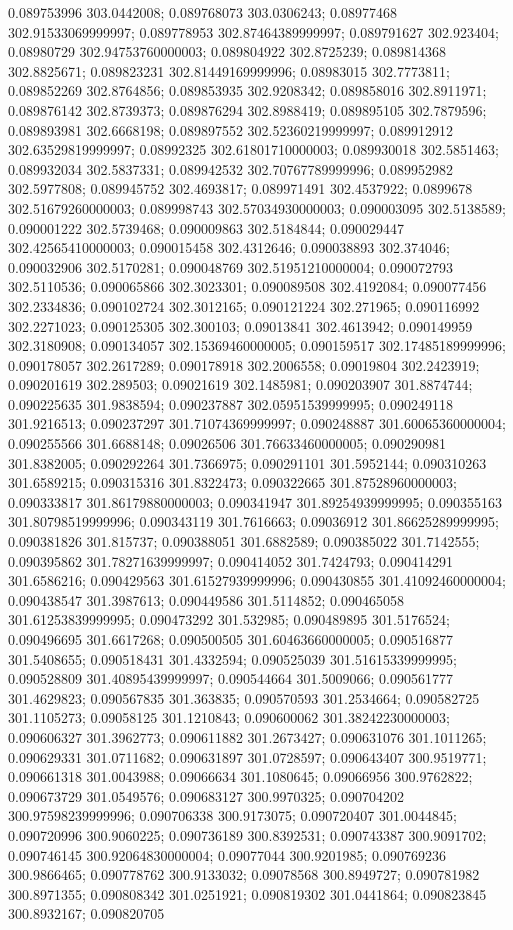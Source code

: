 0.089753996 303.0442008; 0.089768073 303.0306243; 0.08977468 302.91533069999997; 0.089778953 302.87464389999997; 0.089791627 302.923404; 0.08980729 302.94753760000003; 0.089804922 302.8725239; 0.089814368 302.8825671; 0.089823231 302.81449169999996; 0.08983015 302.7773811; 0.089852269 302.8764856; 0.089853935 302.9208342; 0.089858016 302.8911971; 0.089876142 302.8739373; 0.089876294 302.8988419; 0.089895105 302.7879596; 0.089893981 302.6668198; 0.089897552 302.52360219999997; 0.089912912 302.63529819999997; 0.08992325 302.61801710000003; 0.089930018 302.5851463; 0.089932034 302.5837331; 0.089942532 302.70767789999996; 0.089952982 302.5977808; 0.089945752 302.4693817; 0.089971491 302.4537922; 0.0899678 302.51679260000003; 0.089998743 302.57034930000003; 0.090003095 302.5138589; 0.090001222 302.5739468; 0.090009863 302.5184844; 0.090029447 302.42565410000003; 0.090015458 302.4312646; 0.090038893 302.374046; 0.090032906 302.5170281; 0.090048769 302.51951210000004; 0.090072793 302.5110536; 0.090065866 302.3023301; 0.090089508 302.4192084; 0.090077456 302.2334836; 0.090102724 302.3012165; 0.090121224 302.271965; 0.090116992 302.2271023; 0.090125305 302.300103; 0.09013841 302.4613942; 0.090149959 302.3180908; 0.090134057 302.15369460000005; 0.090159517 302.17485189999996; 0.090178057 302.2617289; 0.090178918 302.2006558; 0.09019804 302.2423919; 0.090201619 302.289503; 0.09021619 302.1485981; 0.090203907 301.8874744; 0.090225635 301.9838594; 0.090237887 302.05951539999995; 0.090249118 301.9216513; 0.090237297 301.71074369999997; 0.090248887 301.60065360000004; 0.090255566 301.6688148; 0.09026506 301.76633460000005; 0.090290981 301.8382005; 0.090292264 301.7366975; 0.090291101 301.5952144; 0.090310263 301.6589215; 0.090315316 301.8322473; 0.090322665 301.87528960000003; 0.090333817 301.86179880000003; 0.090341947 301.89254939999995; 0.090355163 301.80798519999996; 0.090343119 301.7616663; 0.09036912 301.86625289999995; 0.090381826 301.815737; 0.090388051 301.6882589; 0.090385022 301.7142555; 0.090395862 301.78271639999997; 0.090414052 301.7424793; 0.090414291 301.6586216; 0.090429563 301.61527939999996; 0.090430855 301.41092460000004; 0.090438547 301.3987613; 0.090449586 301.5114852; 0.090465058 301.61253839999995; 0.090473292 301.532985; 0.090489895 301.5176524; 0.090496695 301.6617268; 0.090500505 301.60463660000005; 0.090516877 301.5408655; 0.090518431 301.4332594; 0.090525039 301.51615339999995; 0.090528809 301.40895439999997; 0.090544664 301.5009066; 0.090561777 301.4629823; 0.090567835 301.363835; 0.090570593 301.2534664; 0.090582725 301.1105273; 0.09058125 301.1210843; 0.090600062 301.38242230000003; 0.090606327 301.3962773; 0.090611882 301.2673427; 0.090631076 301.1011265; 0.090629331 301.0711682; 0.090631897 301.0728597; 0.090643407 300.9519771; 0.090661318 301.0043988; 0.09066634 301.1080645; 0.09066956 300.9762822; 0.090673729 301.0549576; 0.090683127 300.9970325; 0.090704202 300.97598239999996; 0.090706338 300.9173075; 0.090720407 301.0044845; 0.090720996 300.9060225; 0.090736189 300.8392531; 0.090743387 300.9091702; 0.090746145 300.92064830000004; 0.09077044 300.9201985; 0.090769236 300.9866465; 0.090778762 300.9133032; 0.09078568 300.8949727; 0.090781982 300.8971355; 0.090808342 301.0251921; 0.090819302 301.0441864; 0.090823845 300.8932167; 0.090820705 